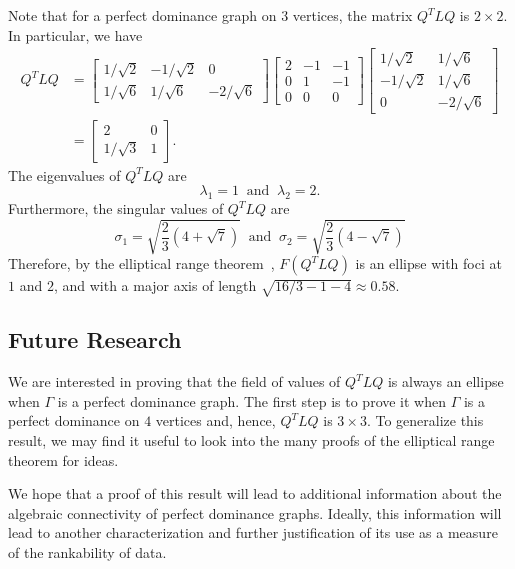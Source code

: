 \documentclass{article}
\begin{document}
Note that for a perfect dominance graph on $3$ vertices, the matrix $Q^{T}LQ$ is $2\times 2$.
In particular, we have
\begin{align*}
Q^{T}LQ &= 
			\begin{bmatrix}1/\sqrt{2} & -1/\sqrt{2} & 0 \\
						1/\sqrt{6} & 1/\sqrt{6} & -2/\sqrt{6} \end{bmatrix}
			\begin{bmatrix} 2 & -1 & -1 \\
						0 & 1 & -1 \\
						0 & 0 & 0 \end{bmatrix}
			\begin{bmatrix}1/\sqrt{2} & 1/\sqrt{6} \\
					-1/\sqrt{2} & 1/\sqrt{6} \\
					0 & -2/\sqrt{6} \end{bmatrix} \\
		&= \begin{bmatrix}2 & 0 \\ 1/\sqrt{3} & 1 \end{bmatrix}.
\end{align*}
The eigenvalues of $Q^{T}LQ$ are
\[
\lambda_{1}=1~\text{ and }~\lambda_{2}=2.
\]
Furthermore, the singular values of $Q^{T}LQ$ are
\[
\sigma_{1} = \sqrt{\frac{2}{3}\left(4+\sqrt{7}\right)}
~\text{ and }~
\sigma_{2} = \sqrt{\frac{2}{3}\left(4-\sqrt{7}\right)}
\]
Therefore, by the elliptical range theorem~\cite{Li1996}, $F(Q^{T}LQ)$ is an ellipse with foci at $1$ and $2$, and with a major axis of length $\sqrt{16/3 - 1 - 4}\approx 0.58$. 

\subsection{Future Research}
We are interested in proving that the field of values of $Q^{T}LQ$ is always an ellipse when $\Gamma$ is a perfect dominance graph. 
The first step is to prove it when $\Gamma$ is a perfect dominance on $4$ vertices and, hence, $Q^{T}LQ$ is $3\times 3$.
To generalize this result, we may find it useful to look into the many proofs of the elliptical range theorem for ideas.

We hope that a proof of this result will lead to additional information about the algebraic connectivity of perfect dominance graphs.
Ideally, this information will lead to another characterization and further justification of its use as a measure of the rankability of data. 


\label{Bibliography}


\end{document}
